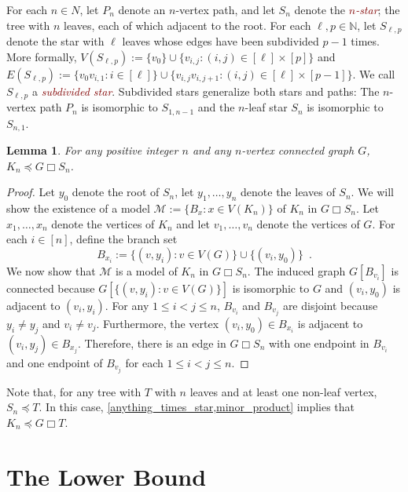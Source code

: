 \documentclass[kpfonts,lotsofwhite]{patmorin}
\newcommand{\defn}[1]{\textcolor{Maroon}{\emph{#1}}}
\newcommand{\boxprod}{\mathbin{\Box}}
\newcommand{\N}{\mathbb{N}}
\renewcommand{\le}{\leqslant}
\DeclareMathOperator{\gm}{gm}
\theoremstyle{plain}
\newtheorem{lem}[thm]{Lemma}
\theoremstyle{definition}
\begin{document}
For each $n\in N$, let $P_n$ denote an $n$-vertex path, and let $S_n$ denote the \defn{$n$-star}; the tree with $n$ leaves, each of which adjacent to the root.  For each $\ell,p\in\N$, let $S_{\ell,p}$ denote the star with $\ell$ leaves whose edges have been subdivided $p-1$ times.  More formally, $V(S_{\ell,p}):=\{v_0\}\cup\{v_{i,j}:(i,j)\in[\ell]\times[p]\}$ and $E(S_{\ell,p}):=\{v_0v_{i,1}:i\in[\ell]\}\cup \{v_{i,j}v_{i,j+1}:(i,j)\in[\ell]\times[p-1]\}$.  We call $S_{\ell,p}$ a \defn{subdivided star}.  Subdivided stars generalize both stars and paths: The $n$-vertex path $P_n$ is isomorphic to $S_{1,n-1}$ and the $n$-leaf star $S_n$ is isomorphic to $S_{n,1}$.

\begin{lem}\label{anything_times_star}
  For any positive integer $n$ and any $n$-vertex connected graph $G$, $K_{n} \preceq G\boxprod S_n$.
\end{lem}

\begin{proof}
  Let $y_0$ denote the root of $S_n$, let $y_1,\ldots,y_n$ denote the leaves of $S_n$.  We will show the existence of a model $\mathcal{M}:=\{B_x:x\in V(K_n)\}$ of $K_n$ in $G\boxprod S_n$.  Let $x_1,\ldots,x_{n}$ denote the vertices of $K_{n}$ and let $v_1,\ldots,v_n$ denote the vertices of $G$.  For each $i\in[n]$, define the branch set
  \[
     B_{x_i}:=\{(v,y_i):v\in V(G)\} \cup \{ (v_{i},y_0) \} \enspace .
  \]
  We now show that $\mathcal{M}$ is a model of $K_n$ in $G\boxprod S_n$.
  The induced graph $G[B_{v_i}]$ is connected because $G[\{(v,y_i):v\in V(G)\}]$ is isomorphic to $G$ and $(v_{i},y_0)$ is adjacent to $(v_{i},y_i)$.
  For any $1\le i< j\le n$, $B_{v_i}$ and $B_{v_j}$ are disjoint because $y_i\neq y_j$ and $v_i\neq v_j$.  Furthermore, the vertex $(v_{i},y_0)\in B_{x_i}$ is adjacent to $(v_i,y_j)\in B_{x_j}$.  Therefore, there is an edge in $G\boxprod S_n$ with one endpoint in $B_{v_i}$ and one endpoint of $B_{v_j}$ for each $1\le i < j\le n$.
\end{proof}

Note that, for any tree with $T$ with $n$ leaves and at least one non-leaf vertex, $S_n\preceq T$.  In this case, \cref{anything_times_star,minor_product} implies that $K_n\preceq G\boxprod T$.

\section{The Lower Bound}

\end{document}
